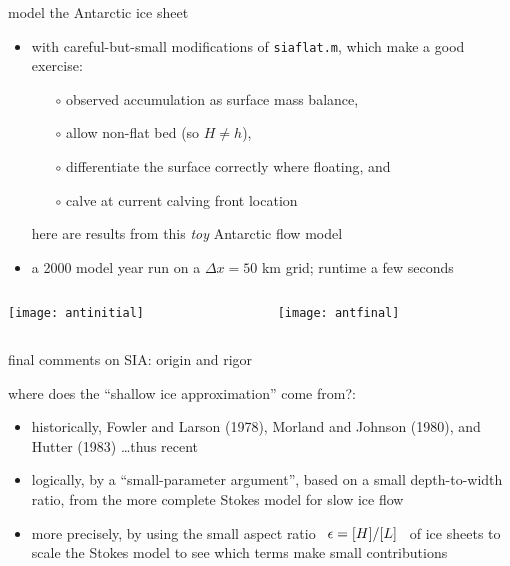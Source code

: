 \begin{frame}{model the Antarctic ice sheet}

\normalsize
\begin{itemize}
\item with careful-but-small modifications of \texttt{siaflat.m}, which make a good exercise:
  \begin{itemize}
  \item[$\circ$] observed accumulation as surface mass balance,
  \item[$\circ$] allow non-flat bed (so $H\ne h$),
  \item[$\circ$] differentiate the surface correctly where floating, and
  \item[$\circ$] calve at current calving front location
  \end{itemize}
here are results from this \emph{toy} Antarctic flow model
\item a 2000 model year run on a $\Delta x=50$ km grid; runtime a few seconds
\end{itemize}

\bigskip

\begin{columns}
\begin{column}{0.4\textwidth}
\texttt{[image: antinitial]}
\end{column}
\begin{column}{0.55\textwidth}
\texttt{[image: antfinal]}
\end{column}
\end{columns}
\end{frame}


\begin{frame}{final comments on SIA: origin and rigor}

where does the ``shallow ice approximation'' come from?:
\bigskip

\begin{itemize}
\item historically, Fowler and Larson (1978)\nocite{FowlerLarson1978}, Morland and Johnson (1980)\nocite{MorlandJohnson}, and Hutter (1983)\nocite{Hutter} \dots thus recent
\item logically, by a ``small-parameter argument'', based on a small depth-to-width ratio, from the more complete Stokes model for slow ice flow
\item more precisely, by using the small aspect ratio \, $\epsilon = [H]/[L]$ \, of ice sheets to scale the Stokes model to see which terms make small contributions
\end{itemize}
\end{frame}